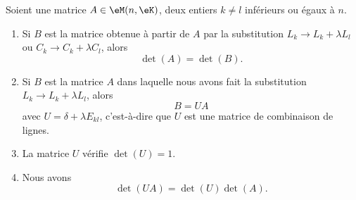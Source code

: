 \begin{proposition}     \label{PROPooPYNHooLbeVhj}
	Soient une matrice \( A\in \eM(n,\eK)\), deux entiers \( k\neq l\) inférieurs ou égaux à \( n\).
	\begin{enumerate}
		\item       \label{ITEMooJSRDooTggEyO}
		      Si \( B\) est la matrice obtenue à partir de \( A\) par la substitution \( L_k\to L_k+\lambda L_l\) ou \( C_k\to C_k+\lambda C_l\), alors
		      \begin{equation}
			      \det(A)=\det(B).
		      \end{equation}
		\item   \label{ITEMooHKZWooVZDgnf}
		      Si \( B\) est la matrice \( A\) dans laquelle nous avons fait la substitution \( L_k\to L_k+\lambda L_l\), alors
		      \begin{equation}
			      B=UA
		      \end{equation}
		      avec \( U=\delta+\lambda E_{kl}\), c'est-à-dire que \( U\) est une matrice de combinaison de lignes.
		\item           \label{ITEMooPGYJooWTTghT}
		      La matrice \( U\) vérifie \( \det(U)=1\).
		\item       \label{ITEMooBBEAooZJVGNV}
		      Nous avons
		      \begin{equation}
			      \det(UA)=\det(U)\det(A).
		      \end{equation}
	\end{enumerate}
\end{proposition}

